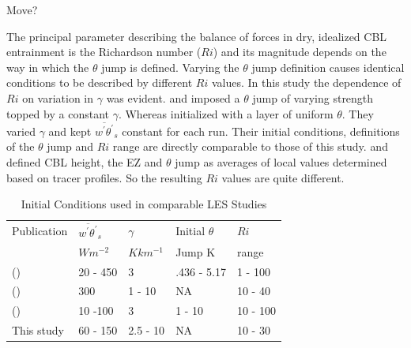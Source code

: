\documentclass[referee]{svjour3}
\begin{document}
Move?

The principal parameter describing the balance of forces in dry, idealized CBL entrainment is the Richardson number ($Ri$) and its magnitude depends on the way in which the $\theta$ jump is defined.  Varying the $\theta$ jump definition causes identical conditions to be described by different $Ri$ values.  In this study the dependence of $Ri$ on variation in $\gamma$ was evident.  \cite{BrooksFowler2} and \cite{SullMoengStev} imposed a $\theta$ jump of varying strength topped by a constant $\gamma$.  Whereas \cite{FedConzMir04} initialized with a layer of uniform $\theta$.  They varied $\gamma$ and kept $\overline{w^{'}\theta^{'}}_{s}$ constant for each run.  Their initial conditions, definitions of the $\theta$ jump and $Ri$ range are directly comparable to those of this study.  \cite{BrooksFowler2} and \cite{SullMoengStev} defined CBL height, the EZ and $\theta$ jump as averages of local values determined based on tracer profiles.  So the resulting $Ri$ values are quite different.    

\begin{table}[htbp]
\caption[Initial Conditions used in comparable LES Studies]{Initial Conditions used in comparable LES Studies}

  
    \begin{tabular}{ p{4cm} p{1.4cm} p{1.4cm} p{1.7cm} p{1.8cm}}
    
Publication & $\overline{w^{'}\theta^{'}}_{s}$& $\gamma$& Initial $\theta$ & $Ri$ \\ 
& $Wm^{-2}$ & $Kkm^{-1}$ & Jump K & range \\ \hline
      \citeauthor{SullMoengStev} (\citeyear{SullMoengStev}) & 20 - 450& 3  &.436 - 5.17 & 1 - 100\\
      \citeauthor{FedConzMir04} (\citeyear{FedConzMir04}) & 300 & 1 - 10 & NA & 10 - 40\\ 
      \citeauthor{BrooksFowler2} (\citeyear{BrooksFowler2}) &  10 -100 &  3& 1 - 10 &10 - 100 \\
      This study & 60 - 150 & 2.5 - 10& NA & 10 - 30\\ \hline 
      
    \end{tabular}
\label{table:initconditcomp}   

\end{table}
\end{document}
